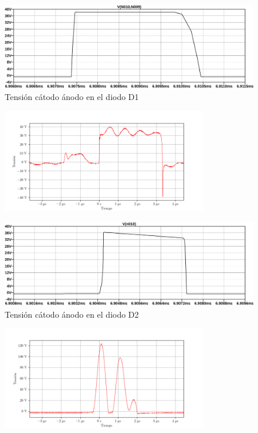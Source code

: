 \begin{figure}[H]
    \centering
    \includegraphics[width=\textwidth]{images/sim/26.pdf}
    \caption{Tensión cátodo ánodo en el diodo D1}
    \label{fig:sim:26}
\end{figure}

\begin{figure}[H]
    \centering
    \includegraphics[width=0.8\textwidth]{images/capturas-osciloscopio/17-11-2022/61.png}
    \caption{}
    \label{fig:osc:61}
\end{figure}

\begin{figure}[H]
    \centering
    \includegraphics[width=\textwidth]{images/sim/27.pdf}
    \caption{Tensión cátodo ánodo en el diodo D2}
    \label{fig:sim:27}
\end{figure}

\begin{figure}[H]
    \centering
    \includegraphics[width=0.8\textwidth]{images/capturas-osciloscopio/17-11-2022/62.png}
    \caption{}
    \label{fig:osc:62}
\end{figure}

